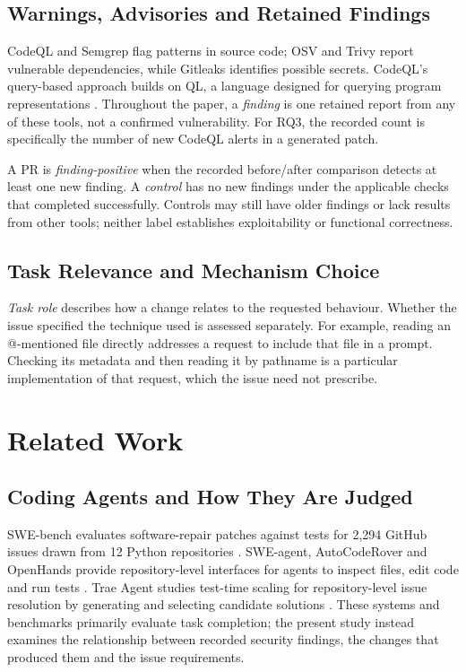 \documentclass[acmsmall,screen,nonacm]{acmart}
\begin{document}
\subsection{Warnings, Advisories and Retained Findings}

CodeQL and Semgrep flag patterns in source code; OSV and Trivy report vulnerable dependencies, while Gitleaks identifies possible secrets. CodeQL's query-based approach builds on QL, a language designed for querying program representations \cite{b44}. Throughout the paper, a \emph{finding} is one retained report from any of these tools, not a confirmed vulnerability. For RQ3, the recorded count is specifically the number of new CodeQL alerts in a generated patch.

A PR is \emph{finding-positive} when the recorded before/after comparison detects at least one new finding. A \emph{control} has no new findings under the applicable checks that completed successfully. Controls may still have older findings or lack results from other tools; neither label establishes exploitability or functional correctness.

\subsection{Task Relevance and Mechanism Choice}

\emph{Task role} describes how a change relates to the requested behaviour. Whether the issue specified the technique used is assessed separately. For example, reading an @-mentioned file directly addresses a request to include that file in a prompt. Checking its metadata and then reading it by pathname is a particular implementation of that request, which the issue need not prescribe.

\section{Related Work}

\subsection{Coding Agents and How They Are Judged}

SWE-bench evaluates software-repair patches against tests for 2,294 GitHub issues drawn from 12 Python repositories \cite{b9}. SWE-agent, AutoCodeRover and OpenHands provide repository-level interfaces for agents to inspect files, edit code and run tests \cite{b22,b25,b20}. Trae Agent studies test-time scaling for repository-level issue resolution by generating and selecting candidate solutions \cite{b47}. These systems and benchmarks primarily evaluate task completion; the present study instead examines the relationship between recorded security findings, the changes that produced them and the issue requirements.
\end{document}
